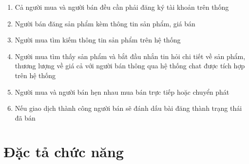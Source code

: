 \documentclass[../DoAn.tex]{subfiles}
\begin{document}
\begin{enumerate}
\item Cả người mua và người bán đều cần phải đăng ký tài khoản trên thống
\item Người bán đăng sản phẩm kèm thông tin sản phẩm, giá bán
\item Người mua tìm kiếm thông tin sản phẩm trên hệ thống
\item Người mua tìm thấy sản phẩm và bắt đầu nhắn tin hỏi chi tiết về sản phẩm, thương lượng về giá cả với người bán thông qua hệ thống chat được tích hợp trên hệ thống
\item Người mua và người bán hẹn nhau mua bán trực tiếp hoặc chuyển phát
\item Nếu giao dịch thành công người bán sẽ đánh dấu bài đăng thành trạng thái đã bán
\end{enumerate}
\newpage

\section{Đặc tả chức năng}
\label{section:2.3}
\end{document}
